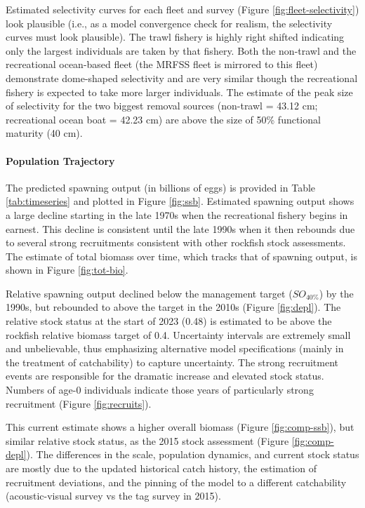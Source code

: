 \documentclass[11pt,
  letterpaper,
]{article}
\begin{document}
Estimated selectivity curves for each fleet and survey (Figure \ref{fig:fleet-selectivity}) look plausible (i.e., as a model convergence check for realism, the selectivity curves must look plausible). The trawl fishery is highly right shifted indicating only the largest individuals are taken by that fishery. Both the non-trawl and the recreational ocean-based fleet (the MRFSS fleet is mirrored to this fleet) demonstrate dome-shaped selectivity and are very similar though the recreational fishery is expected to take more larger individuals. The estimate of the peak size of selectivity for the two biggest removal sources (non-trawl = 43.12 cm; recreational ocean boat = 42.23 cm) are above the size of 50\% functional maturity (40 cm).

\hypertarget{population-trajectory}{%
\paragraph{Population Trajectory}\label{population-trajectory}}

The predicted spawning output (in billions of eggs) is provided in Table \ref{tab:timeseries} and plotted in Figure \ref{fig:ssb}. Estimated spawning output shows a large decline starting in the late 1970s when the recreational fishery begins in earnest. This decline is consistent until the late 1990s when it then rebounds due to several strong recruitments consistent with other rockfish stock assessments. The estimate of total biomass over time, which tracks that of spawning output, is shown in Figure \ref{fig:tot-bio}.

Relative spawning output declined below the management target (\(SO_{40\%}\)) by the 1990s, but rebounded to above the target in the 2010s (Figure \ref{fig:depl}). The relative stock status at the start of 2023 (0.48) is estimated to be above the rockfish relative biomass target of 0.4. Uncertainty intervals are extremely small and unbelievable, thus emphasizing alternative model specifications (mainly in the treatment of catchability) to capture uncertainty. The strong recruitment events are responsible for the dramatic increase and elevated stock status. Numbers of age-0 individuals indicate those years of particularly strong recruitment (Figure \ref{fig:recruits}).

This current estimate shows a higher overall biomass (Figure \ref{fig:comp-ssb}), but similar relative stock status, as the 2015 stock assessment (Figure \ref{fig:comp-depl}). The differences in the scale, population dynamics, and current stock status are mostly due to the updated historical catch history, the estimation of recruitment deviations, and the pinning of the model to a different catchability (acoustic-visual survey vs the tag survey in 2015).
\end{document}
